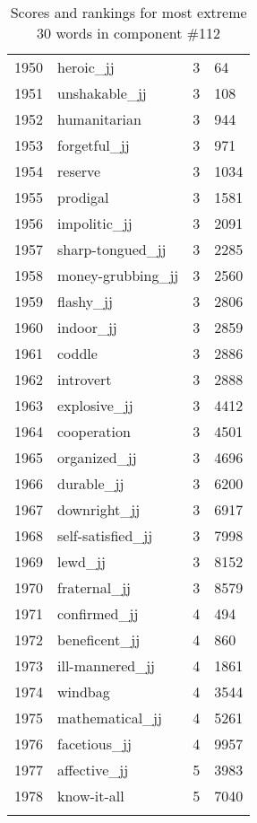 \begin{longtable}[!htbp]{| rlr@{.}l |}
    1950 & heroic\_jj & 3 & 64 \\
    1951 & unshakable\_jj & 3 & 108 \\
    1952 & humanitarian & 3 & 944 \\
    1953 & forgetful\_jj & 3 & 971 \\
    1954 & reserve & 3 & 1034 \\
    1955 & prodigal & 3 & 1581 \\
    1956 & impolitic\_jj & 3 & 2091 \\
    1957 & sharp-tongued\_jj & 3 & 2285 \\
    1958 & money-grubbing\_jj & 3 & 2560 \\
    1959 & flashy\_jj & 3 & 2806 \\
    1960 & indoor\_jj & 3 & 2859 \\
    1961 & coddle & 3 & 2886 \\
    1962 & introvert & 3 & 2888 \\
    1963 & explosive\_jj & 3 & 4412 \\
    1964 & cooperation & 3 & 4501 \\
    1965 & organized\_jj & 3 & 4696 \\
    1966 & durable\_jj & 3 & 6200 \\
    1967 & downright\_jj & 3 & 6917 \\
    1968 & self-satisfied\_jj & 3 & 7998 \\
    1969 & lewd\_jj & 3 & 8152 \\
    1970 & fraternal\_jj & 3 & 8579 \\
    1971 & confirmed\_jj & 4 & 494 \\
    1972 & beneficent\_jj & 4 & 860 \\
    1973 & ill-mannered\_jj & 4 & 1861 \\
    1974 & windbag & 4 & 3544 \\
    1975 & mathematical\_jj & 4 & 5261 \\
    1976 & facetious\_jj & 4 & 9957 \\
    1977 & affective\_jj & 5 & 3983 \\
    1978 & know-it-all & 5 & 7040 \\
    \hline
    \caption{Scores and rankings for most extreme 30 words in component \#112} \\
\end{longtable}
